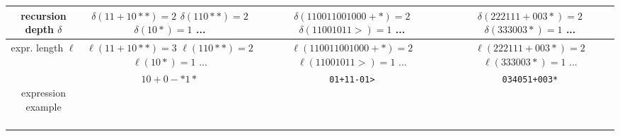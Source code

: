 \documentclass[11pt]{article}
\begin{document}
\begin{table}[htbp]
{\begin{tabular}{|c|c|c|c|}
\makecell{recursion depth\\$\delta$} & 
\makecell{\\$\delta(11+10**)=2$\\\\$\delta(110**)=2$\\\\$\delta(10*)=1$\\\\...\\\\} & 
\makecell{\\$\delta(110011001000+*)=2$\\\\$\delta(11001011>)=1$\\\\...\\\\} & 
\makecell{\\$\delta(222111+003*)=2$\\\\$\delta(333003*)=1$\\\\...\\\\} \\
\hline

\makecell{expr. length\\$\ell$} & 
\makecell{\\$\ell(11+10**)=3$\\\\$\ell(110**)=2$\\\\$\ell(10*)=1$\\\\...\\\\} & 
\makecell{\\$\ell(110011001000+*)=2$\\\\$\ell(11001011>)=1$\\\\...\\\\} & 
\makecell{\\$\ell(222111+003*)=2$\\\\$\ell(333003*)=1$\\\\...\\\\} \\
\hline

\makecell{\\expression\\example\\\\} & $10+0-*1*$ & \texttt{01+11-01>} & \texttt{034051+003*} \\
\hline

\end{tabular}
}
\end{table}
\end{document}

